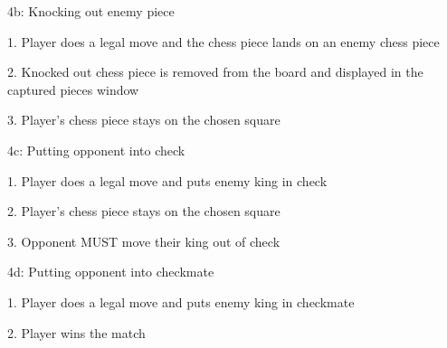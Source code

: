 \documentclass[letterpaper,11pt]{article}
\begin{document}
\begin{list}{}{}
\begin{list}{}{}
			\item 4b: Knocking out enemy piece
			\item \begin{list}{}{}
					\item 1. Player does a legal move and the chess piece lands on an enemy chess piece
					\item 2. Knocked out chess piece is removed from the board and displayed in the captured pieces window
					\item 3. Player's chess piece stays on the chosen square
				\end{list}
			\item 4c: Putting opponent into check
			\item \begin{list}{}{}
					\item 1. Player does a legal move and puts enemy king in check
					\item 2. Player's chess piece stays on the chosen square
					\item 3. Opponent MUST move their king out of check
				\end{list}
			\item 4d: Putting opponent into checkmate
			\item \begin{list}{}{}
					\item 1. Player does a legal move and puts enemy king in checkmate
					\item 2. Player wins the match
				\end{list}
		\end{list}
\end{list}
\end{document}
